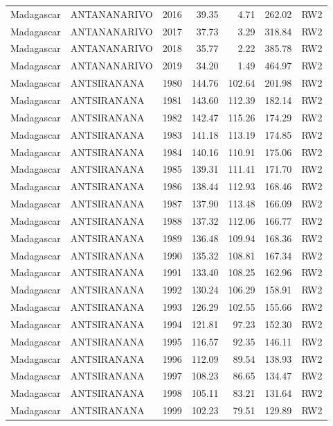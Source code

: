 \begin{longtable}{lllrrrl}
  Madagascar & ANTANANARIVO & 2016 & 39.35 & 4.71 & 262.02 & RW2 \\ 
  Madagascar & ANTANANARIVO & 2017 & 37.73 & 3.29 & 318.84 & RW2 \\ 
  Madagascar & ANTANANARIVO & 2018 & 35.77 & 2.22 & 385.78 & RW2 \\ 
  Madagascar & ANTANANARIVO & 2019 & 34.20 & 1.49 & 464.97 & RW2 \\ 
  Madagascar & ANTSIRANANA & 1980 & 144.76 & 102.64 & 201.98 & RW2 \\ 
  Madagascar & ANTSIRANANA & 1981 & 143.60 & 112.39 & 182.14 & RW2 \\ 
  Madagascar & ANTSIRANANA & 1982 & 142.47 & 115.26 & 174.29 & RW2 \\ 
  Madagascar & ANTSIRANANA & 1983 & 141.18 & 113.19 & 174.85 & RW2 \\ 
  Madagascar & ANTSIRANANA & 1984 & 140.16 & 110.91 & 175.06 & RW2 \\ 
  Madagascar & ANTSIRANANA & 1985 & 139.31 & 111.41 & 171.70 & RW2 \\ 
  Madagascar & ANTSIRANANA & 1986 & 138.44 & 112.93 & 168.46 & RW2 \\ 
  Madagascar & ANTSIRANANA & 1987 & 137.90 & 113.48 & 166.09 & RW2 \\ 
  Madagascar & ANTSIRANANA & 1988 & 137.32 & 112.06 & 166.77 & RW2 \\ 
  Madagascar & ANTSIRANANA & 1989 & 136.48 & 109.94 & 168.36 & RW2 \\ 
  Madagascar & ANTSIRANANA & 1990 & 135.32 & 108.81 & 167.34 & RW2 \\ 
  Madagascar & ANTSIRANANA & 1991 & 133.40 & 108.25 & 162.96 & RW2 \\ 
  Madagascar & ANTSIRANANA & 1992 & 130.24 & 106.29 & 158.91 & RW2 \\ 
  Madagascar & ANTSIRANANA & 1993 & 126.29 & 102.55 & 155.66 & RW2 \\ 
  Madagascar & ANTSIRANANA & 1994 & 121.81 & 97.23 & 152.30 & RW2 \\ 
  Madagascar & ANTSIRANANA & 1995 & 116.57 & 92.35 & 146.11 & RW2 \\ 
  Madagascar & ANTSIRANANA & 1996 & 112.09 & 89.54 & 138.93 & RW2 \\ 
  Madagascar & ANTSIRANANA & 1997 & 108.23 & 86.65 & 134.47 & RW2 \\ 
  Madagascar & ANTSIRANANA & 1998 & 105.11 & 83.21 & 131.64 & RW2 \\ 
  Madagascar & ANTSIRANANA & 1999 & 102.23 & 79.51 & 129.89 & RW2 \\ 

\end{longtable}
